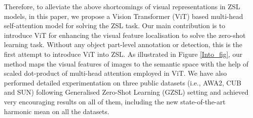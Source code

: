 \documentclass[a4paper,11pt]{article}
\begin{document}



Therefore, to alleviate the above shortcomings of visual representations in ZSL models, in this paper, we propose a Vision Transformer (ViT) \cite{ViT} based multi-head self-attention model for solving the ZSL task. Our main contribution is to introduce ViT for enhancing the visual feature localisation to solve the zero-shot learning task. Without any object part-level annotation or detection, this is the first attempt to introduce ViT into ZSL. As illustrated in Figure \ref{Into_fig}, our method maps the visual features of images to the semantic space with the help of scaled dot-product of multi-head attention employed in ViT. We have also performed detailed experimentation on three public datasets (i.e., AWA2, CUB and SUN) following Generalised Zero-Shot Learning (GZSL) setting and achieved very encouraging results on all of them, including the new state-of-the-art harmonic mean on all the datasets. 
\end{document}
